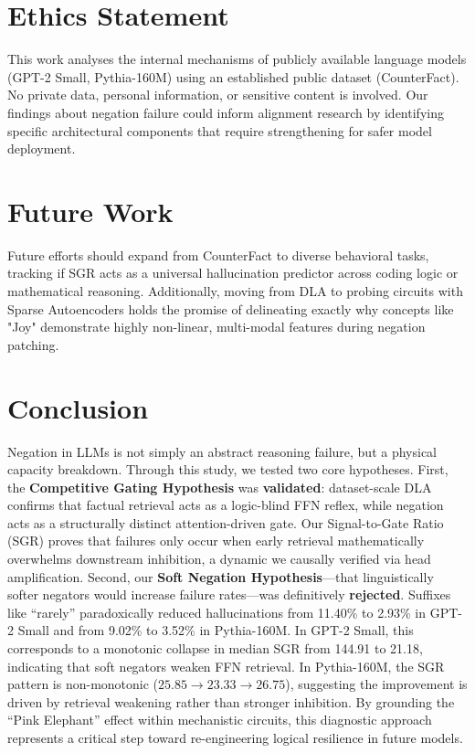 \documentclass[11pt]{article}
\begin{document}
\section{Ethics Statement}
This work analyses the internal mechanisms of publicly available language models (GPT-2 Small, Pythia-160M) using an established public dataset (CounterFact). No private data, personal information, or sensitive content is involved. Our findings about negation failure could inform alignment research by identifying specific architectural components that require strengthening for safer model deployment.

\section{Future Work}
Future efforts should expand from CounterFact to diverse behavioral tasks, tracking if SGR acts as a universal hallucination predictor across coding logic or mathematical reasoning. Additionally, moving from DLA to probing circuits with Sparse Autoencoders holds the promise of delineating exactly why concepts like "Joy" demonstrate highly non-linear, multi-modal features during negation patching.

\section{Conclusion}
\label{sec:conclusion}
Negation in LLMs is not simply an abstract reasoning failure, but a physical capacity breakdown. Through this study, we tested two core hypotheses. First, the \textbf{Competitive Gating Hypothesis} was \textbf{validated}: dataset-scale DLA confirms that factual retrieval acts as a logic-blind FFN reflex, while negation acts as a structurally distinct attention-driven gate. Our Signal-to-Gate Ratio (SGR) proves that failures only occur when early retrieval mathematically overwhelms downstream inhibition, a dynamic we causally verified via head amplification. Second, our \textbf{Soft Negation Hypothesis}---that linguistically softer negators would increase failure rates---was definitively \textbf{rejected}. Suffixes like ``rarely'' paradoxically reduced hallucinations from 11.40\% to 2.93\% in GPT-2 Small and from 9.02\% to 3.52\% in Pythia-160M. In GPT-2 Small, this corresponds to a monotonic collapse in median SGR from 144.91 to 21.18, indicating that soft negators weaken FFN retrieval. In Pythia-160M, the SGR pattern is non-monotonic ($25.85 \to 23.33 \to 26.75$), suggesting the improvement is driven by retrieval weakening rather than stronger inhibition. By grounding the ``Pink Elephant'' effect within mechanistic circuits, this diagnostic approach represents a critical step toward re-engineering logical resilience in future models.


\end{document}
